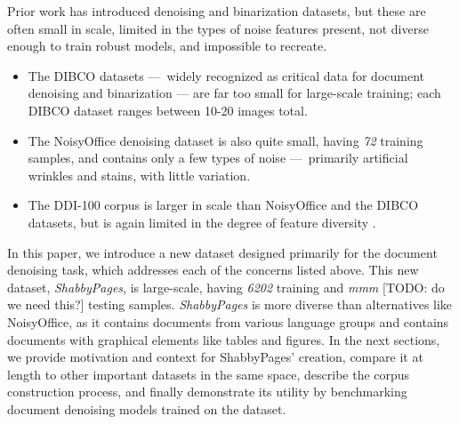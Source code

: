 \documentclass[runningheads]{llncs}
\begin{document}
Prior work has introduced denoising and binarization datasets, but these are often small in scale, limited in the types of noise features present, not diverse enough to train robust models, and impossible to recreate.
\begin{itemize}
\item The DIBCO datasets — widely recognized as critical data for document denoising and binarization — are far too small for large-scale training; each DIBCO dataset ranges between 10-20 images total.
\item The NoisyOffice denoising dataset \cite{ref_NoisyOfficeDatabase} is also quite small, having \emph{72} training samples, and contains only a few types of noise — primarily artificial wrinkles and stains, with little variation.
\item The DDI-100 corpus \cite{ddi-100-2019} is larger in scale than NoisyOffice and the DIBCO datasets, but is again limited in the degree of feature diversity \cite{detection-masking-2022}.
\end{itemize}

In this paper, we introduce a new dataset designed primarily for the document denoising task, which addresses each of the concerns listed above.
This new dataset, \emph{ShabbyPages}, is large-scale, having \emph{6202} training and \emph{mmm} [TODO: do we need this?] testing samples.
\emph{ShabbyPages} is more diverse than alternatives like NoisyOffice, as it contains documents from various language groups and contains documents with graphical elements like tables and figures.
In the next sections, we provide motivation and context for ShabbyPages' creation, compare it at length to other important datasets in the same space, describe the corpus construction process, and finally demonstrate its utility by benchmarking document denoising models trained on the dataset.
\end{document}
